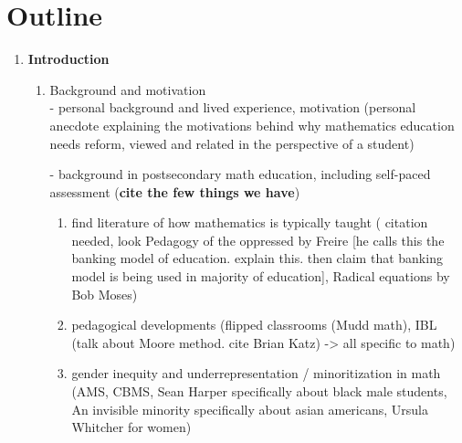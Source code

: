 \chapter{Outline}
\begin{enumerate}
  \item {\bf Introduction }
  \begin{enumerate}
    \item Background and motivation \\
      - personal background and lived experience, motivation
        (personal anecdote explaining the motivations behind why mathematics education needs reform, viewed and related in the perspective of a student)

      - background in postsecondary math education, including self-paced assessment ({\bf cite the few things we have})

      \begin{enumerate}
        \item find literature of how mathematics is typically taught ( citation needed, look Pedagogy of the oppressed by Freire [he calls this the banking model of education. explain this. then claim that banking model is being used in majority of education], Radical equations by Bob Moses)
        \item pedagogical developments (flipped classrooms (Mudd math), IBL (talk about Moore method. cite Brian Katz) -> all specific to math)
        \item gender inequity and underrepresentation / minoritization in math (AMS, CBMS, Sean Harper specifically about black male students, An invisible minority specifically about asian americans, Ursula Whitcher for women)
      \end{enumerate}


\end{enumerate}
\end{enumerate}
